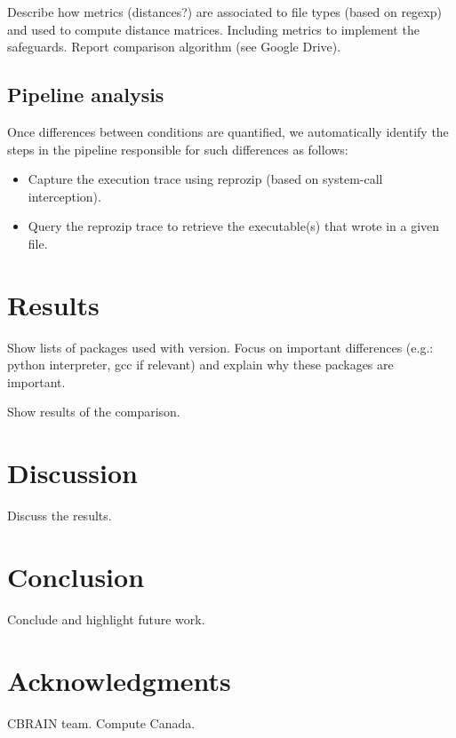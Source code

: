 \documentclass{article}
\begin{document}
Describe how metrics (distances?) are associated to file types (based on regexp) and used to compute distance matrices. Including metrics to implement the safeguards. Report comparison algorithm (see Google Drive).

\subsection{Pipeline analysis}

Once differences between conditions are quantified, we automatically identify the steps in the pipeline responsible for such differences as follows:
\begin{itemize}
\item Capture the execution trace using reprozip (based on system-call interception).
\item Query the reprozip trace to retrieve the executable(s) that wrote in a given file.
\end{itemize}


\section{Results}

Show lists of packages used with version. Focus on important
differences (e.g.: python interpreter, gcc if relevant) and explain
why these packages are important.

Show results of the comparison.

\section{Discussion}

Discuss the results.

\section{Conclusion}

Conclude and highlight future work.

\section{Acknowledgments}

CBRAIN team. Compute Canada.



\end{document}
